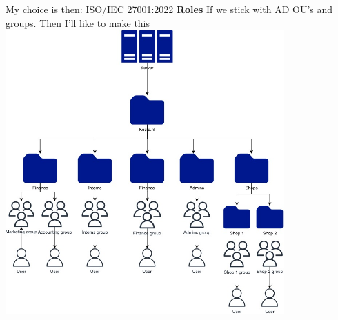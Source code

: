 \documentclass[12pt, letterpaper]{article}
\begin{document}
My choice is then: 
ISO/IEC 27001:2022
\hfill\break
\hfill\break
\textbf{Roles}
\hfill\break
If we stick with AD OU's and groups. Then I'll like to make this 
\hfill\break
\hfill\break
\includegraphics[width=0.8\textwidth]{fotos/Week 9/OU hierarchy.jpg}
\end{document}
